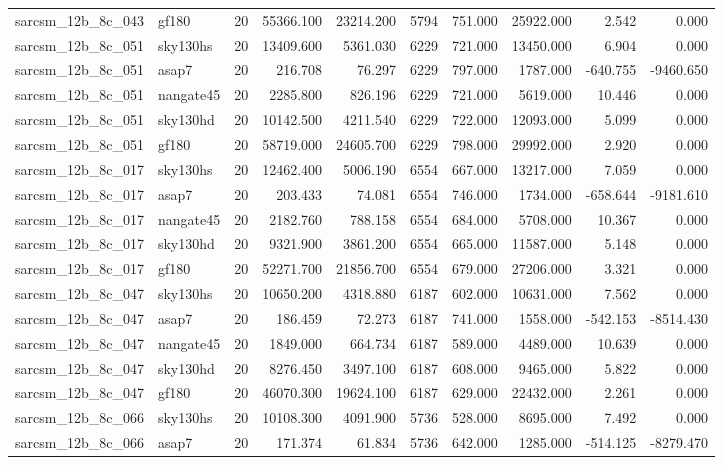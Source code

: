 \begin{tabular}{llrrrrrrrr}
sarcsm\_12b\_8c\_043 & gf180 & 20 & 55366.100 & 23214.200 & 5794 & 751.000 & 25922.000 & 2.542 & 0.000 \\
sarcsm\_12b\_8c\_051 & sky130hs & 20 & 13409.600 & 5361.030 & 6229 & 721.000 & 13450.000 & 6.904 & 0.000 \\
sarcsm\_12b\_8c\_051 & asap7 & 20 & 216.708 & 76.297 & 6229 & 797.000 & 1787.000 & -640.755 & -9460.650 \\
sarcsm\_12b\_8c\_051 & nangate45 & 20 & 2285.800 & 826.196 & 6229 & 721.000 & 5619.000 & 10.446 & 0.000 \\
sarcsm\_12b\_8c\_051 & sky130hd & 20 & 10142.500 & 4211.540 & 6229 & 722.000 & 12093.000 & 5.099 & 0.000 \\
sarcsm\_12b\_8c\_051 & gf180 & 20 & 58719.000 & 24605.700 & 6229 & 798.000 & 29992.000 & 2.920 & 0.000 \\
sarcsm\_12b\_8c\_017 & sky130hs & 20 & 12462.400 & 5006.190 & 6554 & 667.000 & 13217.000 & 7.059 & 0.000 \\
sarcsm\_12b\_8c\_017 & asap7 & 20 & 203.433 & 74.081 & 6554 & 746.000 & 1734.000 & -658.644 & -9181.610 \\
sarcsm\_12b\_8c\_017 & nangate45 & 20 & 2182.760 & 788.158 & 6554 & 684.000 & 5708.000 & 10.367 & 0.000 \\
sarcsm\_12b\_8c\_017 & sky130hd & 20 & 9321.900 & 3861.200 & 6554 & 665.000 & 11587.000 & 5.148 & 0.000 \\
sarcsm\_12b\_8c\_017 & gf180 & 20 & 52271.700 & 21856.700 & 6554 & 679.000 & 27206.000 & 3.321 & 0.000 \\
sarcsm\_12b\_8c\_047 & sky130hs & 20 & 10650.200 & 4318.880 & 6187 & 602.000 & 10631.000 & 7.562 & 0.000 \\
sarcsm\_12b\_8c\_047 & asap7 & 20 & 186.459 & 72.273 & 6187 & 741.000 & 1558.000 & -542.153 & -8514.430 \\
sarcsm\_12b\_8c\_047 & nangate45 & 20 & 1849.000 & 664.734 & 6187 & 589.000 & 4489.000 & 10.639 & 0.000 \\
sarcsm\_12b\_8c\_047 & sky130hd & 20 & 8276.450 & 3497.100 & 6187 & 608.000 & 9465.000 & 5.822 & 0.000 \\
sarcsm\_12b\_8c\_047 & gf180 & 20 & 46070.300 & 19624.100 & 6187 & 629.000 & 22432.000 & 2.261 & 0.000 \\
sarcsm\_12b\_8c\_066 & sky130hs & 20 & 10108.300 & 4091.900 & 5736 & 528.000 & 8695.000 & 7.492 & 0.000 \\
sarcsm\_12b\_8c\_066 & asap7 & 20 & 171.374 & 61.834 & 5736 & 642.000 & 1285.000 & -514.125 & -8279.470 \\

\end{tabular}
